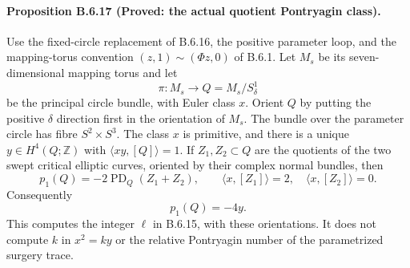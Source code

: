 \paragraph{Proposition B.6.17 (Proved: the actual quotient Pontryagin class).}
Use the fixed-circle replacement of B.6.16, the positive parameter
loop, and the mapping-torus convention
$(z,1)\sim(\Phi z,0)$ of B.6.1.  Let $M_s$ be its
seven-dimensional mapping torus and let
\[
 \pi:M_s\longrightarrow Q=M_s/S^1_\delta
\]
be the principal circle bundle, with Euler class $x$.
Orient $Q$ by putting the positive $\delta$ direction first
in the orientation of $M_s$.  The bundle over the parameter
circle has fibre $S^2\times S^3$.  The class $x$ is primitive,
and there is a unique $y\in H^4(Q;\mathbb Z)$ with
$\langle xy,[Q]\rangle=1$.  If $Z_1,Z_2\subset Q$ are the
quotients of the two swept critical elliptic curves, oriented
by their complex normal bundles, then
\[
 p_1(Q)=-2\operatorname{PD}_Q(Z_1+Z_2),\qquad
 \langle x,[Z_1]\rangle=2,\quad
 \langle x,[Z_2]\rangle=0.
 \tag{B.Q1}
\]
Consequently
\[
                       p_1(Q)=-4y.
 \tag{B.Q2}
\]
This computes the integer $\ell$ in B.6.15, with these
orientations.  It does not compute $k$ in $x^2=ky$ or the
relative Pontryagin number of the parametrized surgery trace.

